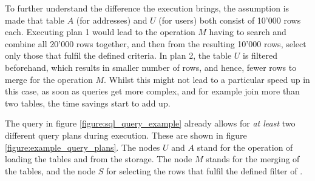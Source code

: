To further understand the difference the execution brings, the assumption is made that table $A$ (for addresses) and $U$ (for users) both consist of 10'000 rows each. Executing plan 1 would lead to the operation $M$ having to search and combine all 20'000 rows together, and then from the resulting 10'000 rows, select only those that fulfil the defined criteria. In plan 2, the table $U$ is filtered beforehand, which results in smaller number of rows, and hence, fewer rows to merge for the operation $M$. Whilst this might not lead to a particular speed up in this case, as soon as queries get more complex, and for example join more than two tables, the time savings start to add up.\par
The query in figure \ref{figure:sql_query_example} already allows for \emph{at least} two different query plans during execution. These are shown in figure \ref{figure:example_query_plans}. The nodes $U$ and $A$ stand for the operation of loading the tables  and  from the storage. The node $M$ stands for the merging of the tables, and the node $S$ for selecting the rows that fulfil the defined filter of .

